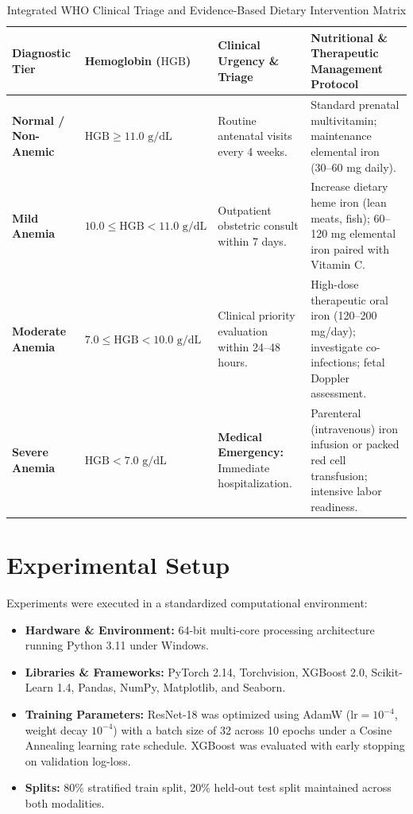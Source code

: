 \documentclass[journal,10pt,twocolumn]{IEEEtran}
\begin{document}
\begin{table}[t]
\centering
\caption{Integrated WHO Clinical Triage and Evidence-Based Dietary Intervention Matrix}
\label{tab:triage_matrix}
\renewcommand{\arraystretch}{1.3}
\begin{tabularx}{\textwidth}{lp{2.4cm}p{4.2cm}p{6.2cm}}
\toprule
\textbf{Diagnostic Tier} & \textbf{Hemoglobin ($\text{HGB}$)} & \textbf{Clinical Urgency \& Triage} & \textbf{Nutritional \& Therapeutic Management Protocol} \\
\midrule
\textbf{Normal / Non-Anemic} & $\text{HGB} \ge 11.0\text{ g/dL}$ & Routine antenatal visits every 4 weeks. & Standard prenatal multivitamin; maintenance elemental iron (30--60 mg daily). \\
\textbf{Mild Anemia} & $10.0 \le \text{HGB} < 11.0\text{ g/dL}$ & Outpatient obstetric consult within 7 days. & Increase dietary heme iron (lean meats, fish); 60--120 mg elemental iron paired with Vitamin C. \\
\textbf{Moderate Anemia} & $7.0 \le \text{HGB} < 10.0\text{ g/dL}$ & Clinical priority evaluation within 24--48 hours. & High-dose therapeutic oral iron (120--200 mg/day); investigate co-infections; fetal Doppler assessment. \\
\textbf{Severe Anemia} & $\text{HGB} < 7.0\text{ g/dL}$ & \textbf{Medical Emergency:} Immediate hospitalization. & Parenteral (intravenous) iron infusion or packed red cell transfusion; intensive labor readiness. \\
\bottomrule
\end{tabularx}
\end{table}

\section{Experimental Setup}
Experiments were executed in a standardized computational environment:
\begin{itemize}
    \item \textbf{Hardware \& Environment:} 64-bit multi-core processing architecture running Python 3.11 under Windows.
    \item \textbf{Libraries \& Frameworks:} PyTorch 2.14, Torchvision, XGBoost 2.0, Scikit-Learn 1.4, Pandas, NumPy, Matplotlib, and Seaborn.
    \item \textbf{Training Parameters:} ResNet-18 was optimized using AdamW ($\text{lr}=10^{-4}$, weight decay $10^{-4}$) with a batch size of 32 across 10 epochs under a Cosine Annealing learning rate schedule. XGBoost was evaluated with early stopping on validation log-loss.
    \item \textbf{Splits:} 80\% stratified train split, 20\% held-out test split maintained across both modalities.
\end{itemize}
\end{document}

